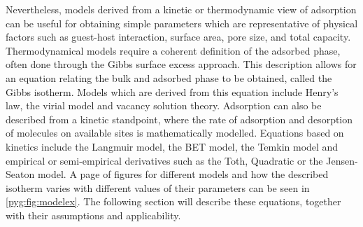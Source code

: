Nevertheless, models derived from a kinetic or thermodynamic
view of adsorption can be useful for obtaining simple parameters
which are representative of physical factors such as
guest-host interaction, surface area, pore size,
and total capacity. Thermodynamical models require a coherent
definition of the adsorbed phase, often done through the 
Gibbs surface excess approach. This description allows for an equation 
relating the bulk and adsorbed phase to be obtained, called
the Gibbs isotherm. Models which are derived from this equation include
Henry's law, the virial model and vacancy solution theory.
Adsorption can also be described from a kinetic standpoint, where
the rate of adsorption and desorption of molecules on
available sites is mathematically modelled. Equations based
on kinetics include the Langmuir model, the \gls{BET} model,
the Temkin model and empirical or semi-empirical derivatives
such as the Toth, Quadratic or the Jensen-Seaton model.
A page of figures for different models and how the
described isotherm varies with different values of
their parameters can be seen in
\autoref{pyg:fig:modelex}. The following section will describe
these equations, together with their assumptions and
applicability.

